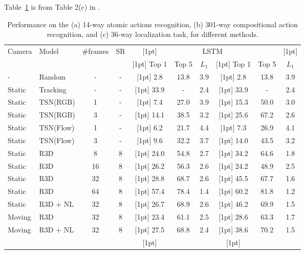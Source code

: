 \documentclass{article} %
\begin{document}
Table~\ref{tab:girdhar2019cater} is from Table 2(c) in \cite{girdhar2019cater}. 

\begin{table}[ht]
    \caption{Performance on the (a) 14-way atomic actions recognition, (b) 301-way compositional action recognition, and (c) 36-way localization task, for different methods.}
    \label{tab:girdhar2019cater}
    \begin{center}
    \begin{tabular}{llcc>{\columncolor[gray]{.85}[1pt]}ccc>{\columncolor[gray]{.85}[1pt]}ccc}
    \toprule
        Camera  & Model     & \#frames  & SR    & \multicolumn{3}{c}{Avg}   & \multicolumn{3}{c}{LSTM}  \\ 
                &           &           &       & Top 1 & Top 5 & $L_1$     & Top 1 & Top 5 & $L_1$     \\ \midrule
        -       & Random    & -         & -     & 2.8   & 13.8  & 3.9       & 2.8   & 13.8  & 3.9       \\ \arrayrulecolor[gray]{.85}\midrule
        Static  & Tracking  & -         & -     & 33.9  & -     & 2.4       & 33.9  & -     & 2.4       \\ \midrule
        Static  & TSN(RGB)  & 1         & -     & 7.4   & 27.0  & 3.9       & 15.3  & 50.0  & 3.0       \\ 
        Static  & TSN(RGB)  & 3         & -     & 14.1  & 38.5  & 3.2       & 25.6  & 67.2  & 2.6       \\ 
        Static  & TSN(Flow) & 1         & -     & 6.2   & 21.7  & 4.4       & 7.3   & 26.9  & 4.1       \\ 
        Static  & TSN(Flow) & 3         & -     & 9.6   & 32.2  & 3.7       & 14.0  & 43.5  & 3.2       \\ \midrule
        Static  & R3D       & 8         & 8     & 24.0  & 54.8  & 2.7       & 34.2  & 64.6  & 1.8       \\
        Static  & R3D       & 16        & 8     & 26.2  & 56.3  & 2.6       & 24.2  & 48.9  & 2.5       \\
        Static  & R3D       & 32        & 8     & 28.8  & 68.7  & 2.6       & 45.5  & 67.7  & 1.6       \\
        Static  & R3D       & 64        & 8     & 57.4  & 78.4  & 1.4       & 60.2  & 81.8  & 1.2       \\ \midrule
        Static  & R3D + NL  & 32        & 8     & 26.7  & 68.9  & 2.6       & 46.2  & 69.9  & 1.5       \\ \midrule
        Moving  & R3D       & 32        & 8     & 23.4  & 61.1  & 2.5       & 28.6  & 63.3  & 1.7       \\
        Moving  & R3D + NL  & 32        & 8     & 27.5  & 68.8  & 2.4       & 38.6  & 70.2  & 1.5       \\ \arrayrulecolor[gray]{0}
    \bottomrule
    \end{tabular}
    \end{center}
\end{table}
\end{document}
